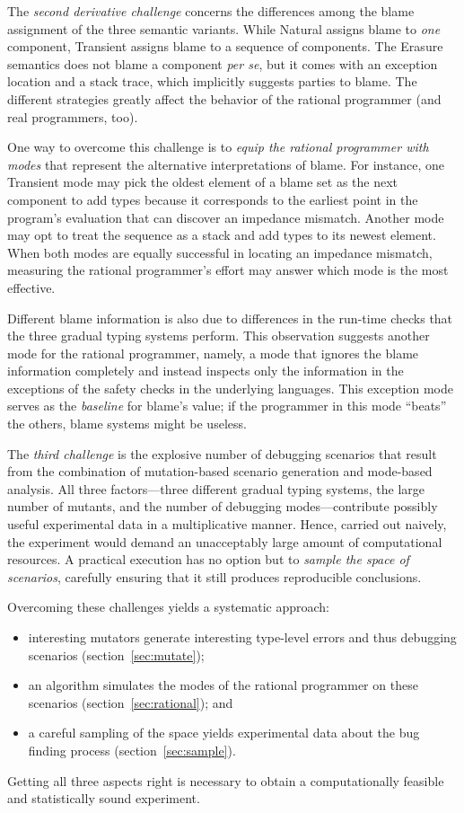 The {\em second derivative challenge\/} concerns the differences among the blame
assignment of the three semantic variants.  While Natural assigns blame to {\em
one\/} component, Transient assigns blame to a sequence of components. The
Erasure semantics does not blame a component {\it per se\/}, but it comes with
an exception location and a stack trace, which implicitly suggests parties to
blame.  The different strategies greatly affect the behavior of the rational
programmer (and real programmers, too).

One way to overcome this challenge is to {\em equip the rational programmer with
modes \/} that represent the alternative interpretations of blame.  For
instance, one Transient mode may pick the oldest element of a blame set as
the next component to add types because it corresponds to the earliest point in
the program's evaluation that can discover an impedance mismatch.  Another mode
may opt to treat the sequence as a stack and add types to its newest element.
When both modes are equally successful in locating an impedance mismatch,
measuring the rational programmer's effort may answer which mode is the most
effective.

Different blame information is also due to differences in the run-time checks
that the three gradual typing systems perform. This observation suggests another
mode for the rational programmer, namely, a mode that ignores the blame
information completely and instead inspects only the information in the
exceptions of the safety checks in the underlying languages.  This exception
mode serves as the {\em baseline\/} for blame's value; if the programmer in this
mode ``beats'' the others, blame systems might be useless.

The {\em third challenge\/} is the explosive number of debugging scenarios that
result from the combination of mutation-based scenario generation and mode-based
analysis. All three factors---three different gradual typing systems, the large
number of mutants, and the number of debugging modes---contribute possibly
useful experimental data in a multiplicative manner. Hence, carried out naively,
the experiment would demand an unacceptably large amount of computational
resources.  A practical execution has no option but to {\em sample the space of
scenarios\/}, carefully ensuring that it still produces reproducible
conclusions.

Overcoming these challenges yields a systematic approach: 
\begin{itemize}

\item interesting mutators generate interesting type-level errors and thus
debugging scenarios (section~\ref{sec:mutate});
    
\item an algorithm simulates the modes of the rational programmer on these
scenarios (section~\ref{sec:rational}); and

\item a careful sampling of the space yields experimental
data about the bug finding process (section~\ref{sec:sample}).
\end{itemize}
Getting all three aspects right is necessary to obtain a computationally
feasible and statistically sound experiment.

